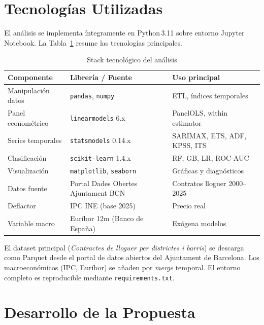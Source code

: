 \documentclass[12pt,a4paper]{article}
\begin{document}
\section{Tecnologías Utilizadas}
\label{sec:tecnologias}

El análisis se implementa íntegramente en Python\,3.11 sobre entorno Jupyter Notebook.
La Tabla~\ref{tab:tech} resume las tecnologías principales.

\begin{table}[H]
\caption{Stack tecnológico del análisis}
\label{tab:tech}
\centering
\small
\begin{tabular}{lll}
\toprule
Componente & Librería / Fuente & Uso principal \\
\midrule
Manipulación datos  & \texttt{pandas}, \texttt{numpy}             & ETL, índices temporales \\
Panel econométrico  & \texttt{linearmodels} 6.x                  & PanelOLS, within estimator \\
Series temporales   & \texttt{statsmodels} 0.14.x                & SARIMAX, ETS, ADF, KPSS, ITS \\
Clasificación       & \texttt{scikit-learn} 1.4.x                & RF, GB, LR, ROC-AUC \\
Visualización       & \texttt{matplotlib}, \texttt{seaborn}       & Gráficas y diagnósticos \\
Datos fuente        & Portal Dades Obertes Ajuntament BCN         & Contratos lloguer 2000--2025 \\
Deflactor           & IPC INE (base 2025)                         & Precio real \\
Variable macro      & Euríbor 12m (Banco de España)               & Exógena modelos \\
\bottomrule
\end{tabular}
\end{table}

El dataset principal (\textit{Contractes de lloguer per districtes i barris}) se
descarga como Parquet desde el portal de datos abiertos del Ajuntament de Barcelona.
Los macroeconómicos (IPC, Euríbor) se añaden por \textit{merge} temporal. El entorno
completo es reproducible mediante \texttt{requirements.txt}.

\section{Desarrollo de la Propuesta}
\label{sec:propuesta}
\end{document}
